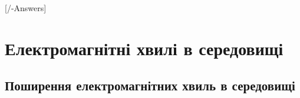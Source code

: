 
[\currfilebase/\currfilebase-Answers]
\chapter{Електромагнітні хвилі в середовищі}\label{\currfilebase}

\section{Поширення електромагнітних хвиль в середовищі}

